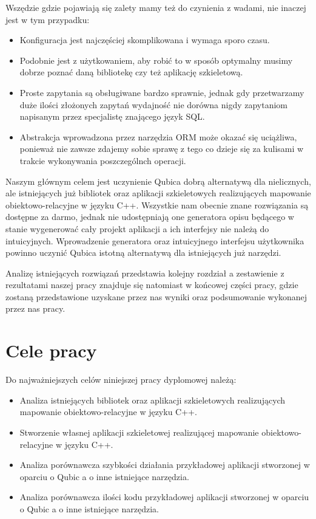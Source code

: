 \documentclass[12pt]{report}
\begin{document}
Wszędzie gdzie pojawiają się zalety mamy też do czynienia z wadami, nie inaczej jest w tym przypadku:

\begin{itemize}
\item Konfiguracja jest najczęściej skomplikowana i wymaga sporo czasu.
\item Podobnie jest z użytkowaniem, aby robić to w sposób optymalny musimy dobrze poznać daną bibliotekę czy też aplikację szkieletową.
\item Proste zapytania są obsługiwane bardzo sprawnie, jednak gdy przetwarzamy duże ilości złożonych zapytań wydajność nie dorówna nigdy zapytaniom napisanym
przez specjalistę znającego język SQL.
\item Abstrakcja wprowadzona przez narzędzia ORM może okazać się uciążliwa, ponieważ nie zawsze zdajemy sobie sprawę z tego co dzieje się za kulisami w trakcie
wykonywania poszczególnch operacji.
\end{itemize}

Naszym głównym celem jest uczynienie Qubica dobrą alternatywą dla nielicznych, ale istniejących już bibliotek oraz aplikacji szkieletowych realizujących mapowanie 
obiektowo-relacyjne w języku C++. Wszystkie nam obecnie znane rozwiązania są dostępne za darmo, jednak nie udostępniają one generatora opisu będącego w stanie 
wygenerować cały projekt aplikacji a ich interfejsy nie należą do intuicyjnych. Wprowadzenie generatora oraz intuicyjnego interfejsu użytkownika powinno uczynić Qubica
istotną alternatywą dla istniejących już narzędzi.

Analizę istniejących rozwiązań przedstawia kolejny rozdział a zestawienie z rezultatami naszej pracy znajduje się natomiast w końcowej części pracy, gdzie zostaną
przedstawione uzyskane przez nas wyniki oraz podsumowanie wykonanej przez nas pracy.

\section{Cele pracy} %

Do najważniejszych celów niniejszej pracy dyplomowej należą:

\begin{itemize}
\item Analiza istniejących bibliotek oraz aplikacji szkieletowych realizujących mapowanie obiektowo-relacyjne w języku C++.
\item Stworzenie własnej aplikacji szkieletowej realizującej mapowanie obiektowo-relacyjne w języku C++.
\item Analiza porównawcza szybkości działania przykładowej aplikacji stworzonej w oparciu o Qubic a o inne istniejące narzędzia.
\item Analiza porównawcza ilości kodu przykładowej aplikacji stworzonej w oparciu o Qubic a o inne istniejące narzędzia.
\end{itemize}
\end{document}
